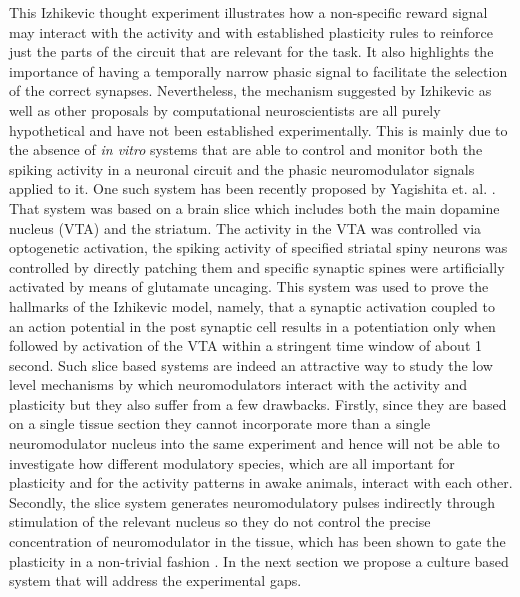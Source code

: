     This Izhikevic thought experiment illustrates how a non-specific reward signal may interact with the activity and with established plasticity rules to reinforce just the parts of the circuit that are relevant for the task. It also highlights the importance of having a temporally narrow phasic signal to facilitate the selection of the correct synapses. Nevertheless, the mechanism suggested by Izhikevic as well as other proposals by computational neuroscientists \cite{fremaux2015neuromodulated} are all purely hypothetical and have not been established experimentally. This is mainly due to the absence of \textit{in vitro} systems that are able to control and monitor both the spiking activity in a neuronal circuit and the phasic neuromodulator signals applied to it. One such system has been recently proposed by Yagishita et. al. \cite{yagishita2014critical}. That system was based on a brain slice which includes both the main dopamine nucleus (VTA) and the striatum. The activity in the VTA was controlled via optogenetic activation, the spiking activity of specified striatal spiny neurons was controlled by directly patching them and specific synaptic spines were artificially activated by means of glutamate uncaging. This system was used to prove the hallmarks of the Izhikevic model, namely, that a synaptic activation coupled to an action potential in the post synaptic cell results in a potentiation only when followed by activation of the VTA within a stringent time window of about 1 second. Such slice based systems are indeed an attractive way to study the low level mechanisms by which neuromodulators interact with the activity and plasticity but they also suffer from a few drawbacks. Firstly, since they are based on a single tissue section they cannot incorporate more than a single neuromodulator nucleus into the same experiment and hence will not be able to investigate how different modulatory species, which are all important for plasticity and for the activity patterns in awake animals, interact with each other. Secondly, the slice system generates neuromodulatory pulses indirectly through stimulation of the relevant nucleus so they do not control the precise concentration of neuromodulator in the tissue, which has been shown to gate the plasticity in a non-trivial fashion \cite{otani2015dopaminergic}. In the next section we propose a culture based system that will address the experimental gaps.

    \label{sec:introduction:izi}

